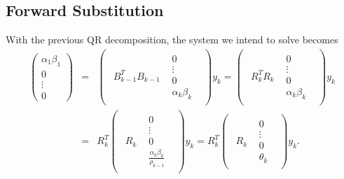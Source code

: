 \documentclass[11pt]{article}
\begin{document}
\subsection{Forward Substitution}
With the previous QR decomposition, the system we intend to solve becomes
\begin{eqnarray*} 
\begin{pmatrix}
\alpha_1\beta_1 \\ 0 \\ \vdots \\ 0
\end{pmatrix} &=& \begin{pmatrix}\begin{array}{c|c}
 B^T_{k-1}B_{k-1} &  \begin{matrix} 0 \\ \vdots \\ 0  \\ \alpha_k\beta_k \end{matrix} 
\end{array}\end{pmatrix} y_k 
= \begin{pmatrix}\begin{array}{c|c}
 R^T_{k}R_{k} &  \begin{matrix} 0 \\ \vdots \\ 0  \\ \alpha_k\beta_k \end{matrix} 
\end{array}\end{pmatrix} y_k \\
&=& R^T_{k} \begin{pmatrix}\begin{array}{c|c}
 R_{k} &  \begin{matrix} 0 \\ \vdots \\ 0  \\ \frac{\alpha_k\beta_k}{\rho_{k-1}} \end{matrix} 
\end{array}\end{pmatrix} y_k
= R^T_{k} \begin{pmatrix}\begin{array}{c|c}
 R_{k} &  \begin{matrix} 0 \\ \vdots \\ 0  \\ \theta_{k} \end{matrix} 
\end{array}\end{pmatrix} y_k.
\end{eqnarray*}
\end{document}
